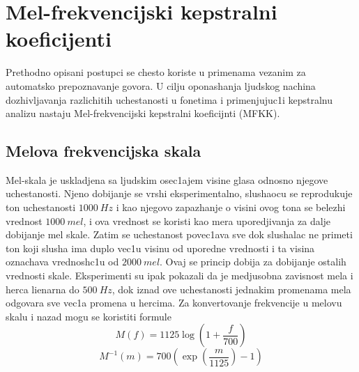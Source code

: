 \documentclass[a4paper, openany, oneside, 11pt]{book}
\begin{document}
\section{Mel-frekvencijski kepstralni koeficijenti}
Prethodno opisani postupci se chesto koriste u primenama vezanim za automat\-sko prepoznavanje govora. U cilju oponashanja ljudskog nachina dozhivljavanja razlichitih uchestanosti u fonetima i primenjujuc1i kepstralnu analizu nastaju Mel-frekvencijski kepstralni koeficijnti (MFKK). 
\subsection{Melova frekvencijska skala}
Mel-skala je uskladjena sa ljudskim osec1ajem visine glasa odnosno njegove uchestanosti. Njeno dobijanje se vrshi eksperimentalno, slushaocu se reprodukuje ton uchestanosti $\SI{1000}{Hz}$ i kao njegovo zapazhanje o visini ovog tona se belezhi vrednost $\SI{1000}{mel}$, i ova vrednost se koristi kao mera uporedjivanja za dalje dobijanje mel skale. Zatim se uchestanost povec1ava sve dok slushalac ne primeti ton koji slusha ima duplo vec1u visinu od uporedne vrednosti i ta visina oznachava vrednosh\-c1u od $\SI{2000}{mel}$. Ovaj se princip dobija za dobijanje ostalih vrednosti skale. Eksperimenti su ipak pokazali da je medjusobna zavisnost mela i herca lienarna do $\SI{500}{Hz}$, dok iznad ove uchestanosti jednakim promenama mela odgovara sve vec1a promena u hercima. Za konvertovanje frekvencije u melovu skalu i nazad mogu se koristiti formule
\begin{equation}\label{freq2mel}
M(f) = 1125\log\left(1+\frac{f}{700}\right)
\end{equation}
\begin{equation}\label{mel2freq}
M^{-1}(m) = 700\left(\exp\left(\frac{m}{1125}\right)-1\right)
\end{equation}
\end{document}
